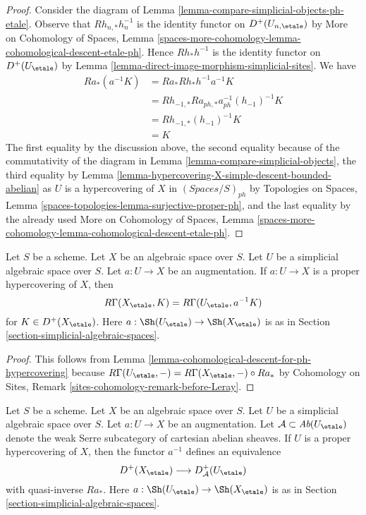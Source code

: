 \begin{proof}
Consider the diagram of Lemma \ref{lemma-compare-simplicial-objects-ph-etale}.
Observe that $Rh_{n, *}h_n^{-1}$ is the identity functor
on $D^+(U_{n, \etale})$ by
More on Cohomology of Spaces, Lemma
\ref{spaces-more-cohomology-lemma-cohomological-descent-etale-ph}.
Hence $Rh_*h^{-1}$ is the identity functor on
$D^+(U_\etale)$ by
Lemma \ref{lemma-direct-image-morphism-simplicial-sites}.
We have
\begin{align*}
Ra_*(a^{-1}K)
& =
Ra_*Rh_*h^{-1}a^{-1}K \\
& =
Rh_{-1, *}Ra_{ph, *}a_{ph}^{-1}(h_{-1})^{-1}K \\
& =
Rh_{-1, *}(h_{-1})^{-1}K \\
& =
K
\end{align*}
The first equality by the discussion above, the second equality
because of the commutativity of the diagram in
Lemma \ref{lemma-compare-simplicial-objects}, the third equality by
Lemma \ref{lemma-hypercovering-X-simple-descent-bounded-abelian}
as $U$ is a hypercovering of $X$ in $(\textit{Spaces}/S)_{ph}$
by Topologies on Spaces, Lemma
\ref{spaces-topologies-lemma-surjective-proper-ph},
and the last equality by the already used
More on Cohomology of Spaces, Lemma
\ref{spaces-more-cohomology-lemma-cohomological-descent-etale-ph}.
\end{proof}

\begin{lemma}
\label{lemma-compute-via-ph-hypercovering}
Let $S$ be a scheme. Let $X$ be an algebraic space over $S$.
Let $U$ be a simplicial algebraic space over $S$. Let $a : U \to X$
be an augmentation. If $a : U \to X$ is a proper hypercovering of $X$, then
$$
R\Gamma(X_\etale, K) = R\Gamma(U_\etale, a^{-1}K)
$$
for $K \in D^+(X_\etale)$. Here $a : \Sh(U_\etale) \to \Sh(X_\etale)$
is as in Section \ref{section-simplicial-algebraic-spaces}.
\end{lemma}

\begin{proof}
This follows from
Lemma \ref{lemma-cohomological-descent-for-ph-hypercovering}
because $R\Gamma(U_\etale, -) = R\Gamma(X_\etale, -) \circ Ra_*$ by
Cohomology on Sites, Remark \ref{sites-cohomology-remark-before-Leray}.
\end{proof}

\begin{lemma}
\label{lemma-ph-hypercovering-equivalence-bounded}
Let $S$ be a scheme. Let $X$ be an algebraic space over $S$.
Let $U$ be a simplicial algebraic space over $S$. Let $a : U \to X$
be an augmentation.
Let $\mathcal{A} \subset \textit{Ab}(U_\etale)$
denote the weak Serre subcategory of cartesian abelian sheaves.
If $U$ is a proper hypercovering of $X$, then
the functor $a^{-1}$ defines an equivalence
$$
D^+(X_\etale) \longrightarrow D_\mathcal{A}^+(U_\etale)
$$
with quasi-inverse $Ra_*$. Here $a : \Sh(U_\etale) \to \Sh(X_\etale)$
is as in Section \ref{section-simplicial-algebraic-spaces}.
\end{lemma}


